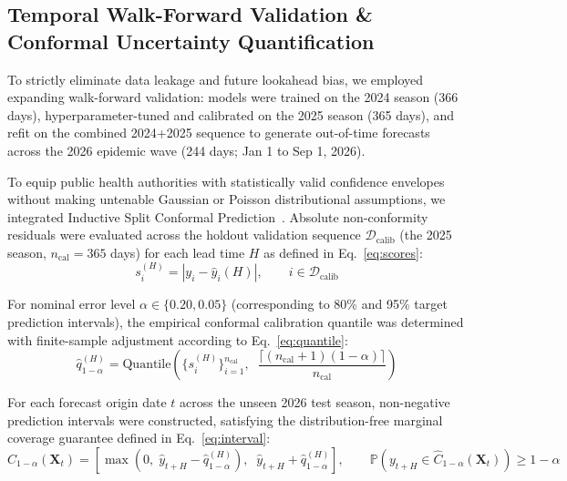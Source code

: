 \documentclass[11pt,a4paper]{article}
\begin{document}
\subsection{Temporal Walk-Forward Validation \& Conformal Uncertainty Quantification}
To strictly eliminate data leakage and future lookahead bias, we employed expanding walk-forward validation: models were trained on the 2024 season (366 days), hyperparameter-tuned and calibrated on the 2025 season (365 days), and refit on the combined 2024+2025 sequence to generate out-of-time forecasts across the 2026 epidemic wave (244 days; Jan 1 to Sep 1, 2026).

To equip public health authorities with statistically valid confidence envelopes without making untenable Gaussian or Poisson distributional assumptions, we integrated Inductive Split Conformal Prediction~\cite{vovk2005algorithmic,angelopoulos2021gentle,tibshirani2019conformal}. Absolute non-conformity residuals were evaluated across the holdout validation sequence $\mathcal{D}_{\text{calib}}$ (the 2025 season, $n_{\text{cal}} = 365$ days) for each lead time $H$ as defined in Eq.~\eqref{eq:scores}:
\begin{equation}
s_i^{(H)} = \left|y_i - \hat{y}_i(H)\right|, \qquad i \in \mathcal{D}_{\text{calib}}
\label{eq:scores}
\end{equation}

For nominal error level $\alpha \in \{0.20, 0.05\}$ (corresponding to 80\% and 95\% target prediction intervals), the empirical conformal calibration quantile was determined with finite-sample adjustment according to Eq.~\eqref{eq:quantile}:
\begin{equation}
\hat{q}_{1-\alpha}^{(H)} = \text{Quantile}\left(\{s_i^{(H)}\}_{i=1}^{n_{\text{cal}}}, \;\; \frac{\lceil(n_{\text{cal}} + 1)(1 - \alpha)\rceil}{n_{\text{cal}}}\right)
\label{eq:quantile}
\end{equation}

For each forecast origin date $t$ across the unseen 2026 test season, non-negative prediction intervals were constructed, satisfying the distribution-free marginal coverage guarantee defined in Eq.~\eqref{eq:interval}:
\begin{equation}
\hat{C}_{1-\alpha}\left(\mathbf{X}_t\right) = \left[\max\left(0, \; \hat{y}_{t+H} - \hat{q}_{1-\alpha}^{(H)}\right), \;\; \hat{y}_{t+H} + \hat{q}_{1-\alpha}^{(H)}\right], \qquad \mathbb{P}\left(y_{t+H} \in \hat{C}_{1-\alpha}\left(\mathbf{X}_t\right)\right) \ge 1 - \alpha
\label{eq:interval}
\end{equation}
\end{document}
